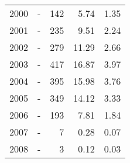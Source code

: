 \begin{longtable}{lXrrr}
        2000 & \multicolumn{1}{X}{-} & %
          \num{142} &
          \num[round-mode=places,round-precision=2]{5.74} &
          \num[round-mode=places,round-precision=2]{1.35} \\

        2001 & \multicolumn{1}{X}{-} & %
          \num{235} &
          \num[round-mode=places,round-precision=2]{9.51} &
          \num[round-mode=places,round-precision=2]{2.24} \\

        2002 & \multicolumn{1}{X}{-} & %
          \num{279} &
          \num[round-mode=places,round-precision=2]{11.29} &
          \num[round-mode=places,round-precision=2]{2.66} \\

        2003 & \multicolumn{1}{X}{-} & %
          \num{417} &
          \num[round-mode=places,round-precision=2]{16.87} &
          \num[round-mode=places,round-precision=2]{3.97} \\

        2004 & \multicolumn{1}{X}{-} & %
          \num{395} &
          \num[round-mode=places,round-precision=2]{15.98} &
          \num[round-mode=places,round-precision=2]{3.76} \\

        2005 & \multicolumn{1}{X}{-} & %
          \num{349} &
          \num[round-mode=places,round-precision=2]{14.12} &
          \num[round-mode=places,round-precision=2]{3.33} \\

        2006 & \multicolumn{1}{X}{-} & %
          \num{193} &
          \num[round-mode=places,round-precision=2]{7.81} &
          \num[round-mode=places,round-precision=2]{1.84} \\

        2007 & \multicolumn{1}{X}{-} & %
          \num{7} &
          \num[round-mode=places,round-precision=2]{0.28} &
          \num[round-mode=places,round-precision=2]{0.07} \\

        2008 & \multicolumn{1}{X}{-} & %
          \num{3} &
          \num[round-mode=places,round-precision=2]{0.12} &
          \num[round-mode=places,round-precision=2]{0.03} \\


\end{longtable}
